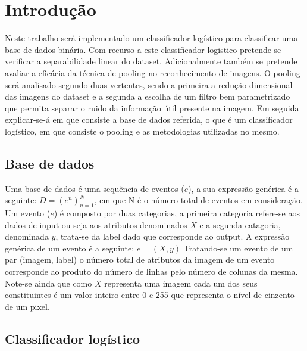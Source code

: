 
\section{Introdução}

Neste trabalho será implementado um classificador logístico para classificar uma base de dados binária. Com recurso a este classificador logistico pretende-se verificar a separabilidade linear do dataset. Adicionalmente também se pretende avaliar a eficácia da técnica de pooling no reconhecimento de imagens. O pooling será analisado segundo duas vertentes, sendo a primeira a redução dimensional das imagens do dataset e a segunda a escolha de um filtro bem parametrizado que permita separar o ruido da informação útil presente na imagem. 
Em seguida explicar-se-á em que consiste a base de dados referida, o que é um classificador logístico, em que consiste o pooling e as metodologias utilizadas no mesmo.


\subsection{Base de dados}

Uma base de dados é uma sequência de eventos ($e$), a sua expressão genérica é a seguinte:
\hfill\newline
\hfill\newline
$D = (e^n)^N_{n=1}$, em que N é o número total de eventos em consideração.
\hfill\newline
\hfill\newline
Um evento ($e$) é composto por duas categorias, a primeira categoria refere-se aos dados de input ou seja aos atributos denominados $X$ e a segunda catagoria, denominada $y$, trata-se da label dado que corresponde ao output. A expressão genérica de um evento é a seguinte:
\hfill\newline
\hfill\newline
$e = (X,y)$
\hfill\newline
\hfill\newline
Tratando-se um evento de um par (imagem, label) o número total de atributos da imagem de um evento corresponde ao produto do número de linhas pelo número de colunas da mesma. Note-se ainda que como $X$ representa uma imagem cada um dos seus constituintes é um valor inteiro entre 0 e 255 que representa o nível de cinzento de um pixel.



\subsection{Classificador logístico}



